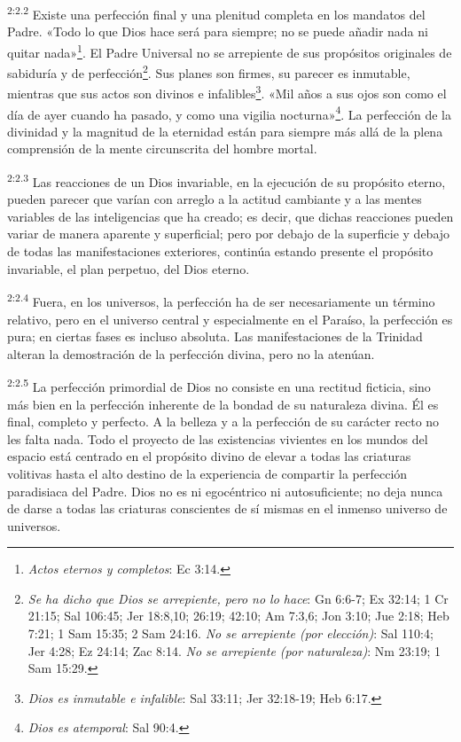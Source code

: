\par
\textsuperscript{2:2.2} Existe una perfección final y una plenitud completa en los mandatos del Padre. «Todo lo que Dios hace será para siempre; no se puede añadir nada ni quitar nada»\footnote{\textit{Actos eternos y completos}: Ec 3:14.}. El Padre Universal no se arrepiente de sus propósitos originales de sabiduría y de perfección\footnote{\textit{Se ha dicho que Dios se arrepiente, pero no lo hace}: Gn 6:6-7; Ex 32:14; 1 Cr 21:15; Sal 106:45; Jer 18:8,10; 26:19; 42:10; Am 7:3,6; Jon 3:10; Jue 2:18; Heb 7:21; 1 Sam 15:35; 2 Sam 24:16. \textit{No se arrepiente (por elección)}: Sal 110:4; Jer 4:28; Ez 24:14; Zac 8:14. \textit{No se arrepiente (por naturaleza)}: Nm 23:19; 1 Sam 15:29.}. Sus planes son firmes, su parecer es inmutable, mientras que sus actos son divinos e infalibles\footnote{\textit{Dios es inmutable e infalible}: Sal 33:11; Jer 32:18-19; Heb 6:17.}. «Mil años a sus ojos son como el día de ayer cuando ha pasado, y como una vigilia nocturna»\footnote{\textit{Dios es atemporal}: Sal 90:4.}. La perfección de la divinidad y la magnitud de la eternidad están para siempre más allá de la plena comprensión de la mente circunscrita del hombre mortal.

\par
\textsuperscript{2:2.3} Las reacciones de un Dios invariable, en la ejecución de su propósito eterno, pueden parecer que varían con arreglo a la actitud cambiante y a las mentes variables de las inteligencias que ha creado; es decir, que dichas reacciones pueden variar de manera aparente y superficial; pero por debajo de la superficie y debajo de todas las manifestaciones exteriores, continúa estando presente el propósito invariable, el plan perpetuo, del Dios eterno.

\par
\textsuperscript{2:2.4} Fuera, en los universos, la perfección ha de ser necesariamente un término relativo, pero en el universo central y especialmente en el Paraíso, la perfección es pura; en ciertas fases es incluso absoluta. Las manifestaciones de la Trinidad alteran la demostración de la perfección divina, pero no la atenúan.

\par
\textsuperscript{2:2.5} La perfección primordial de Dios no consiste en una rectitud ficticia, sino más bien en la perfección inherente de la bondad de su naturaleza divina. Él es final, completo y perfecto. A la belleza y a la perfección de su carácter recto no les falta nada. Todo el proyecto de las existencias vivientes en los mundos del espacio está centrado en el propósito divino de elevar a todas las criaturas volitivas hasta el alto destino de la experiencia de compartir la perfección paradisiaca del Padre. Dios no es ni egocéntrico ni autosuficiente; no deja nunca de darse a todas las criaturas conscientes de sí mismas en el inmenso universo de universos.


